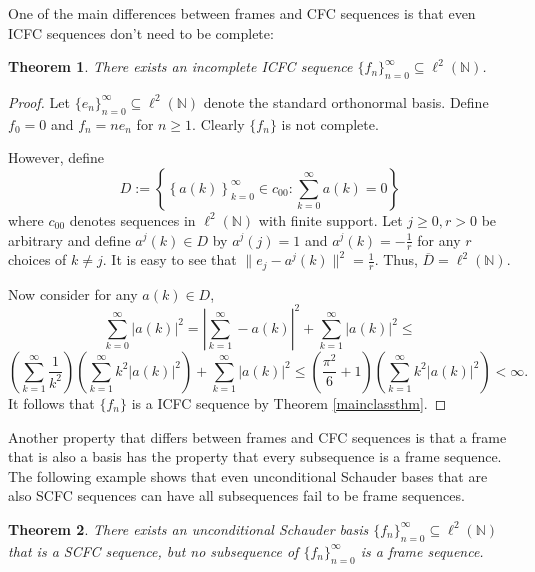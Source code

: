 \documentclass[11pt]{amsart}
\newtheorem{thm}{Theorem}[section]
\theoremstyle{definition}
\numberwithin{equation}{section}
\begin{document}
One of the main differences between frames and CFC sequences is that even ICFC sequences don't need to be complete:
\begin{thm}
There exists an incomplete ICFC sequence $\{f_n\}_{n=0}^{\infty}\subseteq \ell^{2}(\mathbb{N})$.
\end{thm}
\begin{proof}
Let $\{e_n\}_{n=0}^{\infty}\subseteq \ell^{2}(\mathbb{N})$ denote the standard orthonormal basis. Define $f_0=0$ and $f_n=ne_{n}$ for $n\geq 1$. Clearly $\{f_n\}$ is not complete. 

However, define 
$$D:=\left\{ \left\{a(k) \right\}_{k=0}^{\infty}\in c_{00}:\sum_{k=0}^{\infty}a(k)=0 \right\}$$where $c_{00}$ denotes sequences in $\ell^{2}(\mathbb{N})$ with finite support. Let $j\geq0,r>0$ be arbitrary and define $a^{j}(k)\in D$ by $a^{j}(j)=1$ and $a^{j}(k)=-\frac{1}{r}$ for any $r$ choices of $k\neq j$. It is easy to see that $\|e_{j}-a^{j}(k)\|^{2}=\frac{1}{r}$. Thus, $\overline{D}=\ell^{2}
(\mathbb{N})$. 

Now consider for any $a(k)\in D$, 
$$\sum_{k=0}^{\infty}|a(k)|^{2}=\left|\sum_{k=1}^{\infty}-a(k) \right|^{2}+\sum_{k=1}^{\infty}|a(k)|^{2}\leq $$
$$\left(\sum_{k=1}^{\infty}\frac{1}{k^{2}} \right)\left(\sum_{k=1}^{\infty}k^{2}|a(k)|^{2} \right)+\sum_{k=1}^{\infty}|a(k)|^{2}\leq \left(\frac{\pi^{2}}{6}+1 \right)\left(\sum_{k=1}^{\infty}k^{2}|a(k)|^{2} \right)<\infty.$$
It follows that $\{f_n\}$ is a ICFC sequence by Theorem \ref{mainclassthm}.
\end{proof}
Another property that differs between frames and CFC sequences is that a frame that is also a basis has the property that every subsequence is a frame sequence. The following example shows that even unconditional Schauder bases that are also SCFC sequences can have all subsequences fail to be frame sequences.
\begin{thm}
There exists an unconditional Schauder basis $\{f_n\}_{n=0}^{\infty}\subseteq \ell^{2} (\mathbb{N})$ that is a SCFC sequence, but no subsequence of $\{f_n\}_{n=0}^{\infty}$ is a frame sequence.
\end{thm}
\end{document}
